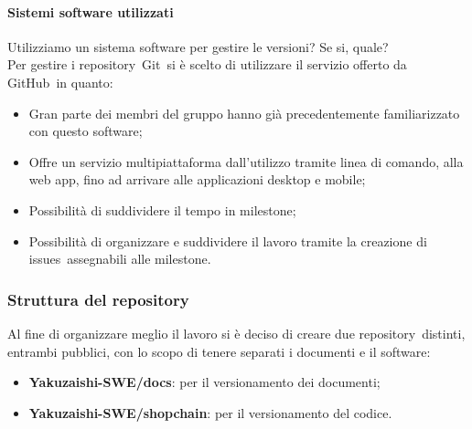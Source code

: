         \paragraph{Sistemi software utilizzati}
        Utilizziamo un sistema software per gestire le versioni? Se si, quale?\\

        Per gestire i repository\glo\ Git\glo\ si è scelto di utilizzare il servizio offerto da GitHub\glo\ in quanto:
        \begin{itemize}
            \item Gran parte dei membri del gruppo hanno già precedentemente familiarizzato con questo software;
            \item Offre un servizio multipiattaforma dall'utilizzo tramite linea di comando, alla web app, fino ad arrivare alle applicazioni desktop e mobile;
            \item Possibilità di suddividere il tempo in milestone\glo;
            \item Possibilità di organizzare e suddividere il lavoro tramite la creazione di issues\glo\ assegnabili alle milestone\glo.
        \end{itemize} 

    \subsubsection{Struttura del repository}
    Al fine di organizzare meglio il lavoro si è deciso di creare due repository\glo\ distinti, entrambi pubblici, con lo scopo di tenere separati i documenti e il software:
    \begin{itemize}
        \item \textbf{Yakuzaishi-SWE/docs}: per il versionamento dei documenti;
        \item \textbf{Yakuzaishi-SWE/shopchain}: per il versionamento del codice.
    \end{itemize}

